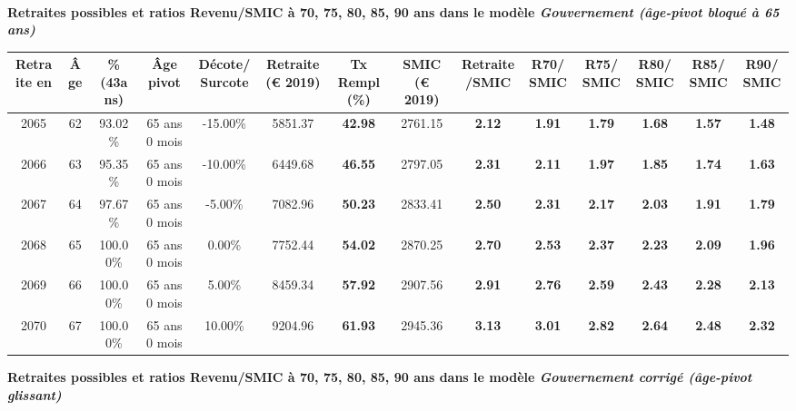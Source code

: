  ~\\{\bf \noindent Retraites possibles et ratios Revenu/SMIC à 70, 75, 80, 85, 90 ans dans le modèle \emph{Gouvernement (âge-pivot bloqué à 65 ans)}}  
 
\begin{adjustbox}{max width=\textwidth} 
\begin{tabular}[htb]{|c|c||c|c|c||c|c||c|c||c|c|c|c|c|} 
\hline 
 Retraite en &  Âge &  \%(43ans) &  Âge pivot &  Décote/Surcote &  Retraite (\euro{} 2019) &  Tx Rempl(\%) &  SMIC (\euro{} 2019) &  Retraite/SMIC &  R70/SMIC &  R75/SMIC &  R80/SMIC &  R85/SMIC &  R90/SMIC \\ 
\hline \hline 
 2065 &  62 &  93.02\% &  65 ans 0 mois &  -15.00\% &  5851.37 &  {\bf 42.98} &  2761.15 &  {\bf 2.12} &  {\bf 1.91} &  {\bf 1.79} &  {\bf 1.68} &  {\bf 1.57} &  {\bf 1.48} \\ 
\hline 
 2066 &  63 &  95.35\% &  65 ans 0 mois &  -10.00\% &  6449.68 &  {\bf 46.55} &  2797.05 &  {\bf 2.31} &  {\bf 2.11} &  {\bf 1.97} &  {\bf 1.85} &  {\bf 1.74} &  {\bf 1.63} \\ 
\hline 
 2067 &  64 &  97.67\% &  65 ans 0 mois &  -5.00\% &  7082.96 &  {\bf 50.23} &  2833.41 &  {\bf 2.50} &  {\bf 2.31} &  {\bf 2.17} &  {\bf 2.03} &  {\bf 1.91} &  {\bf 1.79} \\ 
\hline 
 2068 &  65 &  100.00\% &  65 ans 0 mois &  0.00\% &  7752.44 &  {\bf 54.02} &  2870.25 &  {\bf 2.70} &  {\bf 2.53} &  {\bf 2.37} &  {\bf 2.23} &  {\bf 2.09} &  {\bf 1.96} \\ 
\hline 
 2069 &  66 &  100.00\% &  65 ans 0 mois &  5.00\% &  8459.34 &  {\bf 57.92} &  2907.56 &  {\bf 2.91} &  {\bf 2.76} &  {\bf 2.59} &  {\bf 2.43} &  {\bf 2.28} &  {\bf 2.13} \\ 
\hline 
 2070 &  67 &  100.00\% &  65 ans 0 mois &  10.00\% &  9204.96 &  {\bf 61.93} &  2945.36 &  {\bf 3.13} &  {\bf 3.01} &  {\bf 2.82} &  {\bf 2.64} &  {\bf 2.48} &  {\bf 2.32} \\ 
\hline 
\hline 
\end{tabular} 
\end{adjustbox} 
 
 \vspace{0.1cm} 
{\bf \noindent Retraites possibles et ratios Revenu/SMIC à 70, 75, 80, 85, 90 ans dans le modèle \emph{Gouvernement corrigé (âge-pivot glissant)}}  
 
